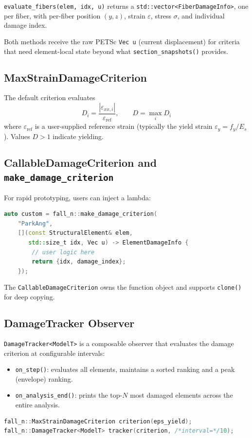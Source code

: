 \texttt{evaluate\_fibers(elem, idx, u)} returns a
\texttt{std::vector<FiberDamageInfo>}, one per fiber, with per-fiber
position $(y,z)$, strain $\varepsilon$, stress $\sigma$, and
individual damage index.

Both methods receive the raw PETSc \texttt{Vec u}
(current displacement) for criteria that need element-local
state beyond what \texttt{section\_snapshots()} provides.

\subsection{MaxStrainDamageCriterion}

The default criterion evaluates
%
\begin{equation}
  D_i = \frac{|\varepsilon_{xx,i}|}{\varepsilon_{\text{ref}}},
  \qquad
  D = \max_i D_i
\end{equation}
%
where $\varepsilon_{\text{ref}}$ is a user-supplied reference strain
(typically the yield strain $\varepsilon_y = f_y / E_s$).
Values $D > 1$ indicate yielding.

\subsection{CallableDamageCriterion and \texttt{make\_damage\_criterion}}

For rapid prototyping, users can inject a lambda:
%
\begin{lstlisting}[language=C++,basicstyle=\ttfamily\small]
auto custom = fall_n::make_damage_criterion(
    "ParkAng",
    [](const StructuralElement& elem,
       std::size_t idx, Vec u) -> ElementDamageInfo {
        // user logic here
        return {idx, damage_index};
    });
\end{lstlisting}
%
The \texttt{CallableDamageCriterion} owns the function object and
supports \texttt{clone()} for deep copying.


\subsection{DamageTracker Observer}

\texttt{DamageTracker<ModelT>} is a composable observer that
evaluates the damage criterion at configurable intervals:
%
\begin{itemize}
  \item \texttt{on\_step()}: evaluates all elements, maintains a
        sorted ranking and a peak (envelope) ranking.
  \item \texttt{on\_analysis\_end()}: prints the top-$N$ most
        damaged elements across the entire analysis.
\end{itemize}
%
\begin{lstlisting}[language=C++,basicstyle=\ttfamily\small]
fall_n::MaxStrainDamageCriterion criterion(eps_yield);
fall_n::DamageTracker<ModelT> tracker(criterion, /*interval=*/10);
\end{lstlisting}



